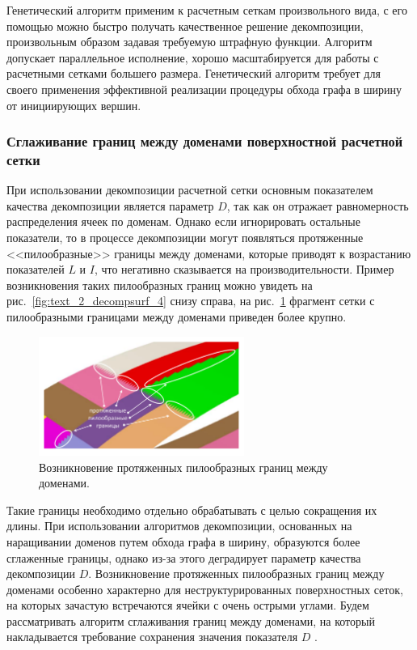 Генетический алгоритм применим к расчетным сеткам произвольного вида, с его помощью можно быстро получать качественное решение декомпозиции, произвольным образом задавая требуемую штрафную функции.
Алгоритм допускает параллельное исполнение, хорошо масштабируется для работы с расчетными сетками большего размера.
Генетический алгоритм требует для своего применения эффективной реализации процедуры обхода графа в ширину от инициирующих вершин.

\subsubsection{Сглаживание границ между доменами поверхностной \mbox{расчетной} сетки}\label{sec:text_2_smooth}

При использовании декомпозиции расчетной сетки основным показателем качества декомпозиции является параметр $D$, так как он отражает равномерность распределения ячеек по доменам.
Однако если игнорировать остальные показатели, то в процессе декомпозиции могут появляться протяженные <<пилообразные>> границы между доменами, которые приводят к возрастанию показателей $L$ и $I$, что негативно сказывается на производительности.
Пример возникновения таких пилообразных границ можно увидеть на рис.~\ref{fig:text_2_decompsurf_4} снизу справа, на рис.~\ref{fig:text_2_smooth_bad_border} фрагмент сетки с пилообразными границами между доменами приведен более крупно.

\begin{figure}[ht]
\centering
\includegraphics[width=0.6\textwidth]{fig/par_bad-border.pdf}
\singlespacing
{}\caption{Возникновение протяженных пилообразных границ между доменами.}
\label{fig:text_2_smooth_bad_border}
\end{figure}

Такие границы необходимо отдельно обрабатывать с целью сокращения их длины.
При использовании алгоритмов декомпозиции, основанных на наращивании доменов путем обхода графа в ширину, образуются более сглаженные границы, однако из-за этого деградирует параметр качества декомпозиции $D$.
Возникновение протяженных пилообразных границ между доменами особенно характерно для неструктурированных поверхностных сеток, на которых зачастую встречаются ячейки с очень острыми углами.
Будем рассматривать алгоритм сглаживания границ между доменами, на который накладывается требование сохранения значения показателя $D$ \cite{Bagrov2021Smooth}.

